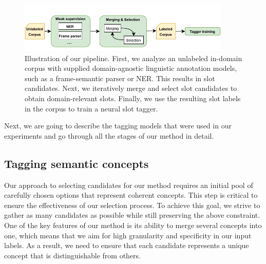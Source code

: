 \begin{figure}[h]
    \centering
    \includegraphics[width=0.9\textwidth]{images/weakly-supervised.pdf}
    \caption{Illustration of our pipeline. First, we analyze an unlabeled in-domain corpus with supplied domain-agnostic linguistic annotation models, such as a frame-semantic parser or NER. This results in slot candidates. Next, we iteratively merge and select slot candidates to obtain domain-relevant slots. Finally, we use the resulting slot labels in the corpus to train a neural slot tagger.}
    \label{fig:discover_overall}
\end{figure}

Next, we are going to describe the tagging models that were used in our experiments and go through all the stages of our method in detail.

\subsection{Tagging semantic concepts}
\label{03:tagging_concepts}
Our approach to selecting candidates for our method requires an initial pool of carefully chosen options that represent coherent concepts. This step is critical to ensure the effectiveness of our selection process. To achieve this goal, we strive to gather as many candidates as possible while still preserving the above constraint.
One of the key features of our method is its ability to merge several concepts into one, which means that we aim for high granularity and specificity in our input labels. As a result, we need to ensure that each candidate represents a unique concept that is distinguishable from others.

